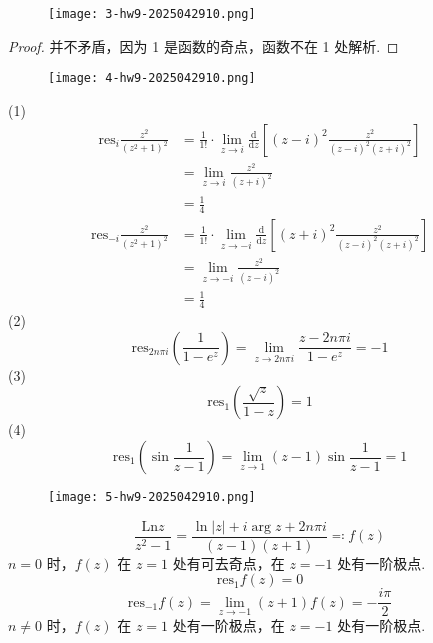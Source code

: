 \begin{exercise}
\begin{figure}[H]
\centering
\texttt{[image: 3-hw9-2025042910.png]}
\label{}
\end{figure}
\end{exercise}
\begin{proof}
并不矛盾，因为 1 是函数的奇点，函数不在 1 处解析.

\end{proof}

\begin{exercise}
\begin{figure}[H]
\centering
\texttt{[image: 4-hw9-2025042910.png]}
\label{}
\end{figure}
\end{exercise}
(1)
\[
\begin{aligned}
\mathrm{res}_{i}\frac{z^2}{(z^2+1)^2} & =\frac{1}{1!}\cdot \lim_{ z \to i } \frac{\mathrm{d}}{\mathrm{d}z} \left[ (z-i)^{2}\frac{z^2}{(z-i)^2(z+i)^2} \right] \\
 & =\lim_{ z \to i } \frac{z^2}{(z+i)^2} \\
 & =\frac{1}{4}
\end{aligned}
\]
\[
\begin{aligned}
\mathrm{res}_{-i}\frac{z^2}{(z^2+1)^2} & =\frac{1}{1!}\cdot \lim_{ z \to -i}\frac{\mathrm{d}}{\mathrm{d}z} \left[ (z+i)^2\frac{z^2}{(z-i)^2(z+i)^2} \right] \\
 & =\lim_{ z \to -i } \frac{z^2}{(z-i)^2} \\
 & =\frac{1}{4}
\end{aligned}
\]
(2)
\[
\mathrm{res}_{2n\pi i}\left( \frac{1}{1-e^{ z }} \right)=\lim_{ z \to 2n \pi i } \frac{z-2n\pi i}{1-e^{ z }}=-1
\]
(3)
\[
\mathrm{res}_{1}\left( \frac{\sqrt{ z }}{1-z} \right)=1
\]
(4)
\[
\mathrm{res}_{1}\left( \sin\frac{1}{z-1} \right)=\lim_{ z \to 1 } (z-1)\sin\frac{1}{z-1}=1
\]
\begin{exercise}
\begin{figure}[H]
\centering
\texttt{[image: 5-hw9-2025042910.png]}
\label{}
\end{figure}
\end{exercise}
\[
\frac{\mathrm{Ln}z}{z^2-1}=\frac{\ln \lvert z \rvert+i\arg z +2n\pi i}{(z-1)(z+1)}\eqqcolon f(z)
\]
$n=0$ 时，$f(z)$ 在 $z=1$ 处有可去奇点，在 $z=-1$ 处有一阶极点.
\[
\mathrm{res}_{1}f(z)=0
\]
\[
\mathrm{res}_{-1}f(z)=\lim_{ z \to -1 } (z+1)f(z)=-\frac{i\pi}{2}
\]
$n\neq0$ 时，$f(z)$ 在 $z=1$ 处有一阶极点，在 $z=-1$ 处有一阶极点.
